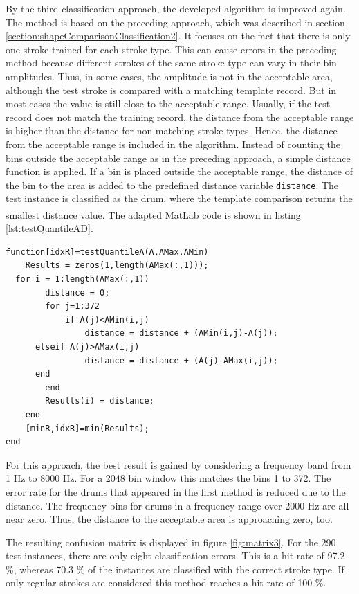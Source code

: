 By the third classification approach, the developed algorithm is improved again. The method is based on the preceding approach, which was described in section \ref{section:shapeComparisonClassification2}. It focuses on the fact that there is only one stroke trained for each stroke type. This can cause errors in the preceding method because different strokes of the same stroke type can vary in their bin amplitudes. Thus, in some cases, the amplitude is not in the acceptable area, although the test stroke is compared with a matching template record. But in most cases the value is still close to the acceptable range. Usually, if the test record does not match the training record, the distance from the acceptable range is higher than the distance for non matching stroke types. Hence, the distance from the acceptable range is included in the algorithm. Instead of counting the bins outside the acceptable range as in the preceding approach, a simple distance function is applied. If a bin is placed outside the acceptable range, the distance of the bin to the area is added to the predefined distance variable \lstinline{distance}. The test instance is classified as the drum, where the template comparison returns the smallest distance value. The adapted MatLab\textsuperscript{\textregistered} code is shown in listing \ref{lst:testQuantileAD}.

\begin{lstlisting}[caption={testQuantileAD},label={lst:testQuantileAD}]
function[idxR]=testQuantileA(A,AMax,AMin)
	Results = zeros(1,length(AMax(:,1)));    
  for i = 1:length(AMax(:,1))
		distance = 0;  
		for j=1:372
			if A(j)<AMin(i,j)
				distance = distance + (AMin(i,j)-A(j));
      elseif A(j)>AMax(i,j)
				distance = distance + (A(j)-AMax(i,j));			
      end
		end
		Results(i) = distance; 
	end
	[minR,idxR]=min(Results);
end
\end{lstlisting}


For this approach, the best result is gained by considering a frequency band from 1 Hz to 8000 Hz. For a 2048 bin window this matches the bins 1 to 372. The error rate for the drums that appeared in the first method is reduced due to the distance. The frequency bins for drums in a frequency range over 2000 Hz are all near zero. Thus, the distance to the acceptable area is approaching zero, too.

The resulting confusion matrix is displayed in figure \ref{fig:matrix3}. For the 290 test instances, there are only eight classification errors. This is a hit-rate of 97.2 \%, whereas 70.3 \% of the instances are classified with the correct stroke type. If only regular strokes are considered this method reaches a hit-rate of 100 \%. 


